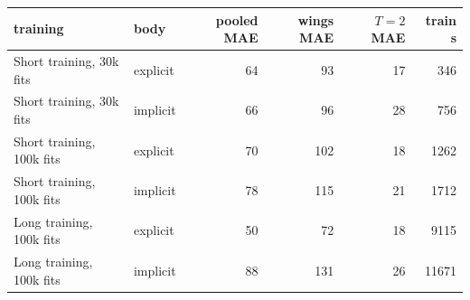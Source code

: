 \begin{tabular}{l l r r r r}
\toprule
training & body & pooled MAE & wings MAE & $T=2$ MAE & train s\\
\midrule
Short training, 30k fits & explicit & 64 & 93 & 17 & 346\\
Short training, 30k fits & implicit & 66 & 96 & 28 & 756\\
Short training, 100k fits & explicit & 70 & 102 & 18 & 1262\\
Short training, 100k fits & implicit & 78 & 115 & 21 & 1712\\
Long training, 100k fits & explicit & 50 & 72 & 18 & 9115\\
Long training, 100k fits & implicit & 88 & 131 & 26 & 11671\\
\bottomrule
\end{tabular}

